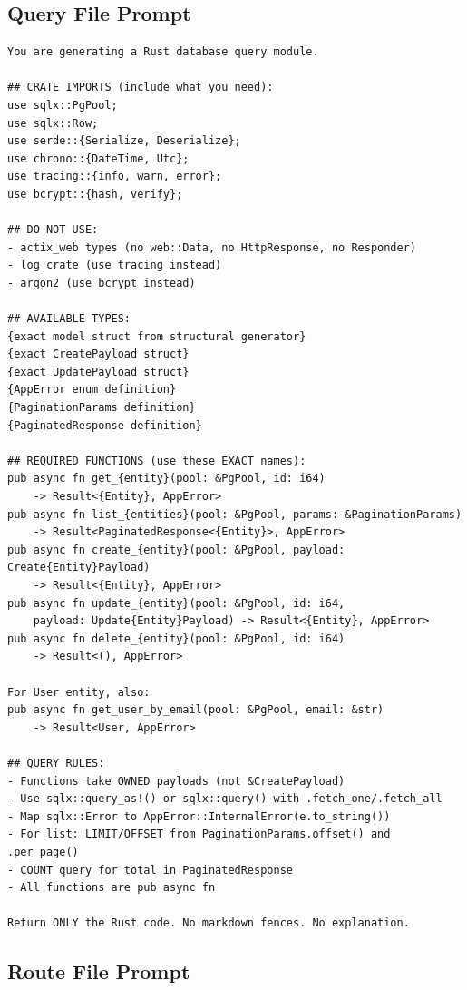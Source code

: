 \documentclass[11pt,a4paper]{article}
\begin{document}
\subsection{Query File Prompt}

\begin{lstlisting}[language={}]
You are generating a Rust database query module.

## CRATE IMPORTS (include what you need):
use sqlx::PgPool;
use sqlx::Row;
use serde::{Serialize, Deserialize};
use chrono::{DateTime, Utc};
use tracing::{info, warn, error};
use bcrypt::{hash, verify};

## DO NOT USE:
- actix_web types (no web::Data, no HttpResponse, no Responder)
- log crate (use tracing instead)
- argon2 (use bcrypt instead)

## AVAILABLE TYPES:
{exact model struct from structural generator}
{exact CreatePayload struct}
{exact UpdatePayload struct}
{AppError enum definition}
{PaginationParams definition}
{PaginatedResponse definition}

## REQUIRED FUNCTIONS (use these EXACT names):
pub async fn get_{entity}(pool: &PgPool, id: i64)
    -> Result<{Entity}, AppError>
pub async fn list_{entities}(pool: &PgPool, params: &PaginationParams)
    -> Result<PaginatedResponse<{Entity}>, AppError>
pub async fn create_{entity}(pool: &PgPool, payload: Create{Entity}Payload)
    -> Result<{Entity}, AppError>
pub async fn update_{entity}(pool: &PgPool, id: i64,
    payload: Update{Entity}Payload) -> Result<{Entity}, AppError>
pub async fn delete_{entity}(pool: &PgPool, id: i64)
    -> Result<(), AppError>

For User entity, also:
pub async fn get_user_by_email(pool: &PgPool, email: &str)
    -> Result<User, AppError>

## QUERY RULES:
- Functions take OWNED payloads (not &CreatePayload)
- Use sqlx::query_as!() or sqlx::query() with .fetch_one/.fetch_all
- Map sqlx::Error to AppError::InternalError(e.to_string())
- For list: LIMIT/OFFSET from PaginationParams.offset() and .per_page()
- COUNT query for total in PaginatedResponse
- All functions are pub async fn

Return ONLY the Rust code. No markdown fences. No explanation.
\end{lstlisting}

\subsection{Route File Prompt}
\end{document}
